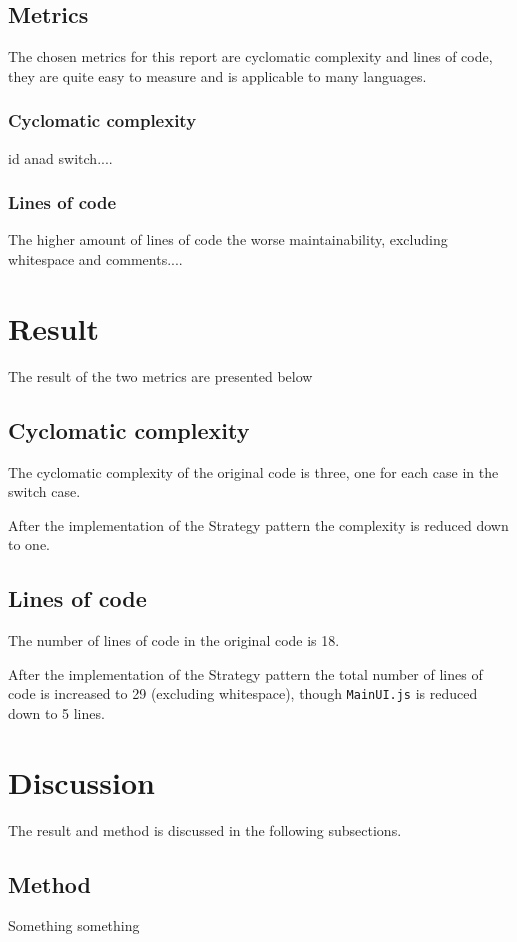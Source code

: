 \documentclass[conference, a4paper]{IEEEtran}
\begin{document}
\subsection{Metrics}
The chosen metrics for this report are cyclomatic complexity and lines of code, they are quite easy to measure and is applicable to many languages.

\subsubsection{Cyclomatic complexity}
id anad switch....

\subsubsection{Lines of code}
The higher amount of lines of code the worse maintainability, excluding whitespace and comments....

\section{Result}
The result of the two metrics are presented below

\subsection{Cyclomatic complexity}
The cyclomatic complexity of the original code is three, one for each case in the switch case.

After the implementation of the Strategy pattern the complexity is reduced down to one.

\subsection{Lines of code}
The number of lines of code in the original code is 18.

After the implementation of the Strategy pattern the total number of lines of code is increased to 29 (excluding whitespace), though \texttt{MainUI.js} is reduced down to 5 lines.

\section{Discussion}
The result and method is discussed in the following subsections.

\subsection{Method}
Something something
\end{document}
